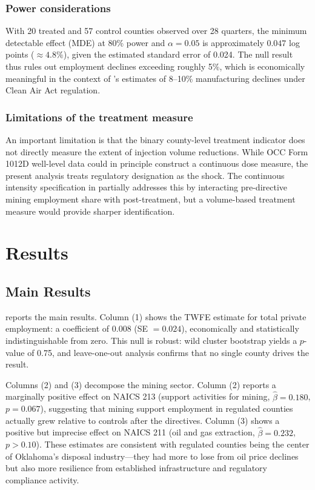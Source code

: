 \documentclass[12pt]{article}
\begin{document}
\subsubsection*{Power considerations} With 20 treated and 57 control counties observed over 28 quarters, the minimum detectable effect (MDE) at 80\% power and $\alpha = 0.05$ is approximately $0.047$ log points ($\approx 4.8\%$), given the estimated standard error of 0.024. The null result thus rules out employment declines exceeding roughly 5\%, which is economically meaningful in the context of \citet{greenstone2002}'s estimates of 8--10\% manufacturing declines under Clean Air Act regulation.

\subsubsection*{Limitations of the treatment measure} An important limitation is that the binary county-level treatment indicator does not directly measure the extent of injection volume reductions. While OCC Form 1012D well-level data could in principle construct a continuous dose measure, the present analysis treats regulatory designation as the shock. The continuous intensity specification in  partially addresses this by interacting pre-directive mining employment share with post-treatment, but a volume-based treatment measure would provide sharper identification.


\section{Results}

\subsection{Main Results}



 reports the main results. Column (1) shows the TWFE estimate for total private employment: a coefficient of 0.008 (SE $= 0.024$), economically and statistically indistinguishable from zero. This null is robust: wild cluster bootstrap yields a $p$-value of 0.75, and leave-one-out analysis confirms that no single county drives the result.

Columns (2) and (3) decompose the mining sector. Column (2) reports a marginally positive effect on NAICS 213 (support activities for mining, $\hat{\beta} = 0.180$, $p = 0.067$), suggesting that mining support employment in regulated counties actually grew relative to controls after the directives. Column (3) shows a positive but imprecise effect on NAICS 211 (oil and gas extraction, $\hat{\beta} = 0.232$, $p > 0.10$). These estimates are consistent with regulated counties being the center of Oklahoma's disposal industry---they had more to lose from oil price declines but also more resilience from established infrastructure and regulatory compliance activity.
\end{document}
